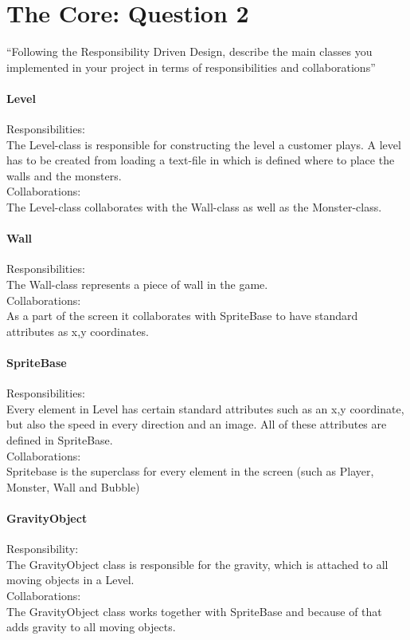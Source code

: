 \chapter{The Core: Question 2}

``Following the Responsibility Driven Design, describe the main classes you implemented in your project in terms of responsibilities and collaborations''

\subsubsection{Level}
Responsibilities: \\
The Level-class is responsible for constructing the level a customer plays. A level has to be created from loading a text-file in which is defined where to place the walls and the monsters. \\
Collaborations: \\
The Level-class collaborates with the Wall-class as well as the Monster-class. 

\subsubsection{Wall}
Responsibilities: \\
The Wall-class represents a piece of wall in the game. \\
Collaborations: \\
As a part of the screen it collaborates with SpriteBase to have standard attributes as x,y coordinates. 

\subsubsection{SpriteBase}
Responsibilities: \\
Every element in Level has certain standard attributes such as an x,y coordinate, but also the speed in every direction and an image. All of these attributes are defined in SpriteBase. \\
Collaborations: \\
Spritebase is the superclass for every element in the screen (such as Player, Monster, Wall and Bubble)

\subsubsection{GravityObject}
Responsibility: \\
The GravityObject class is responsible for the gravity, which is attached to all moving objects in a Level. \\
Collaborations: \\
The GravityObject class works together with SpriteBase and because of that adds gravity to all moving objects. 

